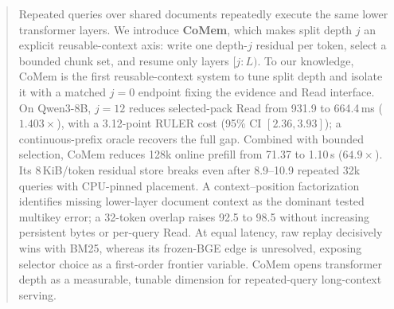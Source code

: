 \begin{abstract}
Repeated queries over shared documents repeatedly execute the same lower
transformer layers. We introduce \textbf{CoMem}, which makes split depth $j$ an
explicit reusable-context axis: write one depth-$j$ residual per token, select a
bounded chunk set, and resume only layers $[j{:}L)$. To our knowledge, CoMem is the first reusable-context system to tune split
depth and isolate it with a matched $j{=}0$ endpoint fixing the evidence and
Read interface. On Qwen3-8B, $j{=}12$ reduces selected-pack
Read from 931.9 to 664.4\,ms ($1.403\times$), with a 3.12-point RULER cost
(95\% CI $[2.36,3.93]$); a continuous-prefix oracle recovers the full gap.
Combined with bounded selection, CoMem reduces 128k online prefill from 71.37
to 1.10\,s ($64.9\times$). Its 8\,KiB/token residual store breaks even after
8.9--10.9 repeated 32k queries with CPU-pinned placement. A context--position
factorization identifies missing lower-layer document context as the dominant
tested multikey error; a 32-token overlap raises 92.5 to 98.5 without increasing
persistent bytes or per-query Read. At equal latency, raw replay decisively wins
with BM25, whereas its frozen-BGE edge is unresolved, exposing selector choice
as a first-order frontier variable. CoMem opens transformer depth as a
measurable, tunable dimension for repeated-query long-context serving.
\end{abstract}
